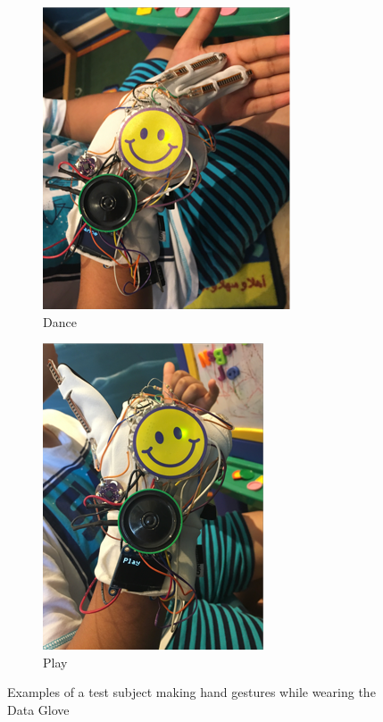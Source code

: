 \begin{figure}
    \centering
    \begin{subfigure}{.4\linewidth}
        \centering
        \setlength\figureheight{\linewidth}
        \setlength\figurewidth{\linewidth}
        \includegraphics{./assets/img/Dance}
        \caption{Dance}
        \label{fig:dance}
    \end{subfigure}
    \hspace{1cm}
    \begin{subfigure}{.4\linewidth}
        \centering
        \includegraphics{./assets/img/Play}
        \caption{Play}
        \label{fig:play}
    \end{subfigure}
    \caption{Examples of a test subject making hand gestures while wearing the Data Glove}
    \label{fig:examplegestures}
\end{figure}

